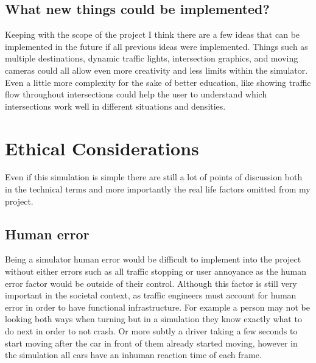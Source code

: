 \documentclass[10pt,twocolumn]{article}
\begin{document}
\subsection{What new things could be implemented?}
Keeping with the scope of the project I think there are a few ideas that can be implemented in the future if all previous ideas were implemented. Things such as multiple destinations, dynamic traffic lights, intersection graphics, and moving cameras could all allow even more creativity and less limits within the simulator. Even a little more complexity for the sake of better education, like showing traffic flow throughout intersections could help the user to understand which intersections work well in different situations and densities. 
\section{Ethical Considerations}
Even if this simulation is simple there are still a lot of points of discussion both in the technical terms and more importantly the real life factors omitted from my project. 
\subsection{Human error}
Being a simulator human error would be difficult to implement into the project without either errors such as all traffic stopping or user annoyance as the human error factor would be outside of their control. Although this factor is still very important in the societal context, as traffic engineers must account for human error in order to have functional infrastructure. For example a person may not be looking both ways when turning but in a simulation they know exactly what to do next in order to not crash. Or more subtly a driver taking a few seconds to start moving after the car in front of them already started moving, however in the simulation all cars have an inhuman reaction time of each frame. 
\end{document}

